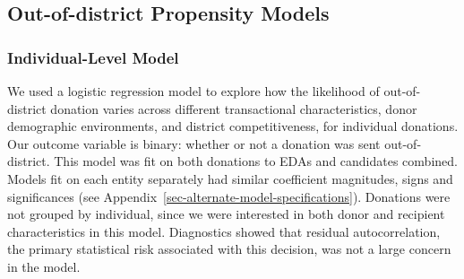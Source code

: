 \documentclass[
  letterpaper,
  DIV=11,
  numbers=noendperiod]{scrartcl}
\begin{document}
\subsection{Out-of-district Propensity
Models}\label{sec-model-specification}

\subsubsection{Individual-Level
Model}\label{sec-model-specification-individual}

We used a logistic regression model to explore how the likelihood of
out-of-district donation varies across different transactional
characteristics, donor demographic environments, and district
competitiveness, for individual donations. Our outcome variable is
binary: whether or not a donation was sent out-of-district. This model
was fit on both donations to EDAs and candidates combined. Models fit on
each entity separately had similar coefficient magnitudes, signs and
significances (see Appendix~\ref{sec-alternate-model-specifications}).
Donations were not grouped by individual, since we were interested in
both donor and recipient characteristics in this model. Diagnostics
showed that residual autocorrelation, the primary statistical risk
associated with this decision, was not a large concern in the model.
\end{document}
